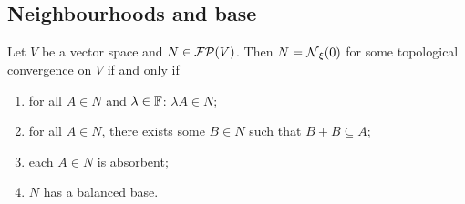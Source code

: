 \subsection{Neighbourhoods and base}
\begin{proposition} \label{TVSconstruction}
Let $V$ be a vector space and $N\in\operatorname{\mathcal{FP}}(V)$. Then $N = \operatorname{\mathcal{N}}_\xi(0)$ for some topological convergence on $V$ \textup{if and only if}
\begin{enumerate}
\item for all $A\in N$ and $\lambda\in \mathbb{F}$: $\lambda A\in N$;
\item for all $A\in N$, there exists some $B\in N$ such that $B+B\subseteq A$;
\item each $A \in N$ is absorbent;
\item $N$ has a balanced base.
\end{enumerate}
\end{proposition}
